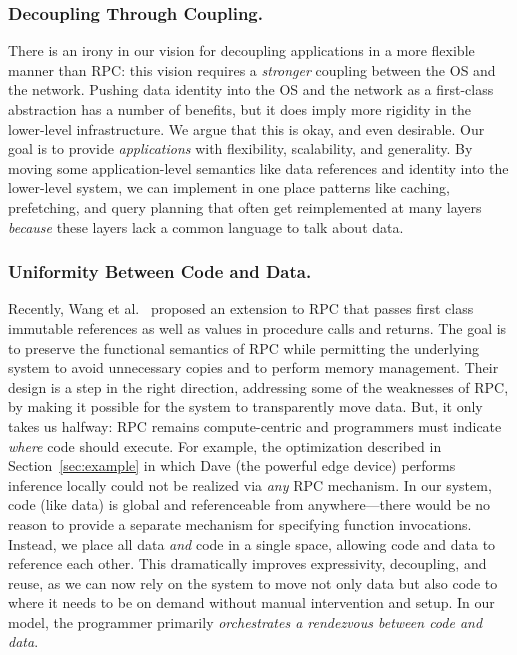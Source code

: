 \subsubsection{Decoupling Through Coupling.}
%
There is an irony in our vision for decoupling applications in a more
flexible manner than RPC: this vision requires a \emph{stronger}
coupling between the OS and the network.
Pushing data identity into the OS and the network as a first-class
abstraction has a number of benefits, but it does imply more rigidity
in the lower-level infrastructure. We argue that this is okay, and even desirable. Our
goal is to provide \emph{applications} with flexibility, scalability,
and generality. By moving some application-level semantics
like data references and identity into the lower-level system, we
can implement in one place patterns like caching, prefetching, and
query planning that often get reimplemented at many layers
\emph{because} these layers lack a common language to
talk about data.


\subsubsection{Uniformity Between Code and Data.}
%
Recently, Wang et al.~\cite{wang:hotos21} proposed an extension to RPC
that passes first class immutable references as well
as values in procedure calls and returns.  The goal is to preserve the
functional semantics of RPC while permitting the underlying system to
avoid unnecessary copies and to perform memory management.  Their
design is a step in the right direction, addressing some of the
weaknesses of RPC, by making it possible for the system
to transparently move data.  But, it only takes us halfway: RPC remains
compute-centric and programmers must indicate
\emph{where} code should execute.  For example, the optimization
described in Section~\ref{sec:example} in which Dave (the powerful
edge device) performs inference locally could not be realized via
\emph{any} RPC mechanism.  In our system, code (like data) is global
and referenceable from anywhere---there would be no reason to provide a
separate mechanism for specifying function invocations. Instead, we
place all data \emph{and} code in a single space, allowing code
and data to reference each other. This dramatically improves
expressivity, decoupling, and reuse, as we can now rely on the system
to move not only data but also code to where it needs to be on demand
without manual intervention and setup. In our model, the programmer
primarily \emph{orchestrates a rendezvous between code and data}.


